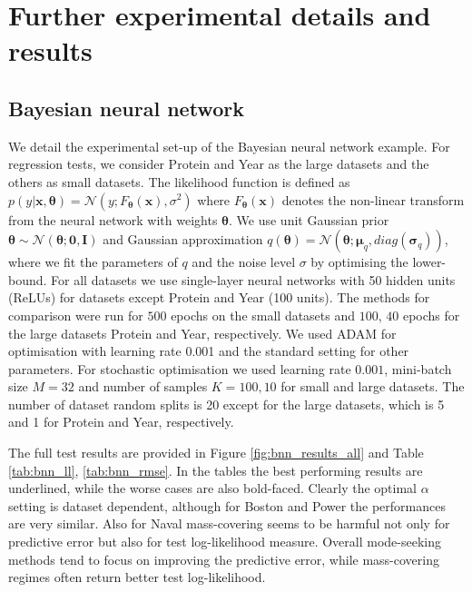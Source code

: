 \section{Further experimental details and results}
\label{sec:exp_details}

\subsection{Bayesian neural network}
We detail the experimental set-up of the Bayesian neural network example.
%
For regression tests, we consider Protein and Year as the large datasets and the others as small datasets. The likelihood function is defined as $p(y|\bm{x}, \bm{\theta}) = \mathcal{N}(y; F_{\bm{\theta}}(\bm{x}), \sigma^2)$ where $F_{\bm{\theta}}(\bm{x})$ denotes the non-linear transform from the neural network with weights $\bm{\theta}$. We use unit Gaussian prior $\bm{\theta} \sim \mathcal{N}(\bm{\theta}; \bm{0}, \bm{I})$ and Gaussian approximation $q(\bm{\theta}) = \mathcal{N}(\bm{\theta}; \bm{\mu}_q, diag(\bm{\sigma}_q))$, where we fit the parameters of $q$ and the noise level $\sigma$ by optimising the lower-bound. For all datasets we use single-layer neural networks with 50 hidden units (ReLUs) for datasets except Protein and Year (100 units). The methods for comparison were run for $500$ epochs on the small datasets and $100$, $40$ epochs for the large datasets Protein and Year, respectively. We used ADAM \cite{kingma:adam} for optimisation with learning rate 0.001 and the standard setting for other parameters. For stochastic optimisation we used learning rate $0.001$, mini-batch size $M = 32$ and number of samples $K=100, 10$ for small and large datasets. The number of dataset random splits is 20 except for the large datasets, which is 5 and 1 for Protein and Year, respectively. 

The full test results are provided in Figure \ref{fig:bnn_results_all} and Table \ref{tab:bnn_ll}, \ref{tab:bnn_rmse}. In the tables the best performing results are underlined, while the worse cases are also bold-faced. Clearly the optimal $\alpha$ setting is dataset dependent, although for Boston and Power the performances are very similar. Also for Naval mass-covering seems to be harmful not only for predictive error but also for test log-likelihood measure. Overall mode-seeking methods tend to focus on improving the predictive error, while mass-covering regimes often return better test log-likelihood. 


